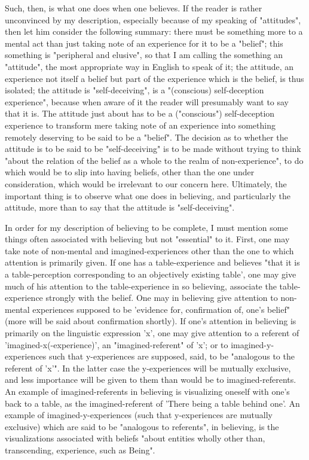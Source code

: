 \documentclass[10pt,twoside,draft]{memoir}
\begin{document}
{Such, then, is what one does when one believes. If the reader is rather 
unconvinced by my description, especially because of my speaking of 
"attitudes", then let him consider the following summary: there must be 
something more to a mental act than just taking note of an experience for it 
to be a "belief"; this something is "peripheral and elusive", so that I am 
calling the something an "attitude", the most appropriate way in English to 
speak of it; the attitude, an experience not itself a belief but part of the 
experience which is the belief, is thus isolated; the attitude is 
"self-deceiving", is a "(conscious) self-deception experience", because when 
aware of it the reader will presumably want to say that it is. The attitude just 
about has to be a ("conscious") self-deception experience to transform mere 
taking note of an experience into something remotely deserving to be said to 
be a "belief". The decision as to whether the attitude is to be said to be 
"self-deceiving" is to be made without trying to think "about the relation of 
the belief as a whole to the realm of non-experience", to do which would be 
to slip into having beliefs, other than the one under consideration, which 
would be irrelevant to our concern here. Ultimately, the important thing is 
to observe what one does in believing, and particularly the attitude, more 
than to say that the attitude is "self-deceiving". 

In order for my description of believing to be complete, I must mention 
some things often associated with believing but not "essential" to it. First, 
one may take note of non-mental and imagined-experiences other than the 
one to which attention is primarily given. If one has a table-experience and 
believes "that it is a table-perception corresponding to an objectively existing 
table', one may give much of his attention to the table-experience in so 
believing, associate the table-experience strongly with the belief. One may in 
believing give attention to non-mental experiences supposed to be 'evidence 
for, confirmation of, one's belief" (more will be said about confirmation 
shortly). If one's attention in believing is primarily on the linguistic 
expression 'x', one may give attention to a referent of 
'imagined-x(-experience)', an "imagined-referent" of 'x'; or to 
imagined-y-experiences such that y-experiences are supposed, said, to be 
"analogous to the referent of 'x'". In the latter case the y-experiences will be 
mutually exclusive, and less importance will be given to them than would be 
to imagined-referents. An example of imagined-referents in believing is 
visualizing oneself with one's back to a table, as the imagined-referent of 
'There being a table behind one'. An example of imagined-y-experiences 
(such that y-experiences are mutually exclusive) which are said to be 
"analogous to referents", in believing, is the visualizations associated with 
beliefs "about entities wholly other than, transcending, experience, such as 
Being". 

}
\end{document}
